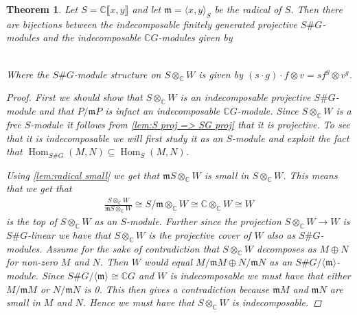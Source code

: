 \documentclass[11pt, a4paper, english]{article}
\numberwithin{prop}{section}
\numberwithin{lemma}{section}
\newtheorem{theorem}{Theorem}
\numberwithin{theorem}{section}
\numberwithin{defin}{section}
\numberwithin{example}{section}
\newcommand{\C}{\mathbb{C}}
\DeclareMathOperator{\Hom}{Hom}
\begin{document}
\begin{theorem}
Let $S = \C\llbracket x, y \rrbracket$ and let $\mathfrak{m} = \langle x, y \rangle_S$ be the radical of $S$. Then there are bijections between the indecomposable finitely generated projective $S\#G$-modules and the indecomposable $\C G$-modules given by

\\
Where the $S\#G$-module structure on $S \otimes_\C W$ is given by $(s \cdot g) \cdot f \otimes v = sf^g \otimes v^g$.

\begin{proof}
First we should show that $S \otimes_\C W$ is an indecomposable projective $S\#G$-module and that $P/\mathfrak{m}P$ is infact an indecomposable $\C G$-module. Since $S \otimes_\C W$ is a free $S$-module it follows from \cref{lem:S proj => SG proj} that it is projective. To see that it is indecomposable we will first study it as an $S$-module and exploit the fact that $\Hom_{S\#G}(M,N) \subseteq \Hom_S(M,N)$. 

Using \cref{lem:radical small} we get that $\mathfrak{m}S \otimes_\C W$ is small in $S\otimes_\C W$. This means that we get that 
\begin{align*}
\frac{S \otimes_\C W}{\mathfrak{m}S \otimes_\C W} \cong S/\mathfrak{m} \otimes_\C W \cong \C \otimes_\C W \cong W
\end{align*}
is the top of $S \otimes_\C W$ as an $S$-module. Further since the projection $S \otimes_\C W \to W$ is $S\#G$-linear we have that $S \otimes_\C W$ is the projective cover of $W$ also as $S\#G$-modules. Assume for the sake of contradiction that $S \otimes_\C W$ decomposes as $M \oplus N$ for non-zero $M$ and $N$. Then $W$ would equal $M/\mathfrak{m}M \oplus N/\mathfrak{m}N$ as an $S\#G/ \langle \mathfrak{m} \rangle$-module. Since $S\#G/ \langle \mathfrak{m} \rangle \cong \C G$ and $W$ is indecomposable we must have that either $M/\mathfrak{m}M$ or $N/\mathfrak{m}N$ is 0. This then gives a contradiction because $\mathfrak{m}M$ and $\mathfrak{m}N$ are small in $M$ and $N$. Hence we must have that $S \otimes_\C W$ is indecomposable.


\end{proof}
\end{theorem}
\end{document}
